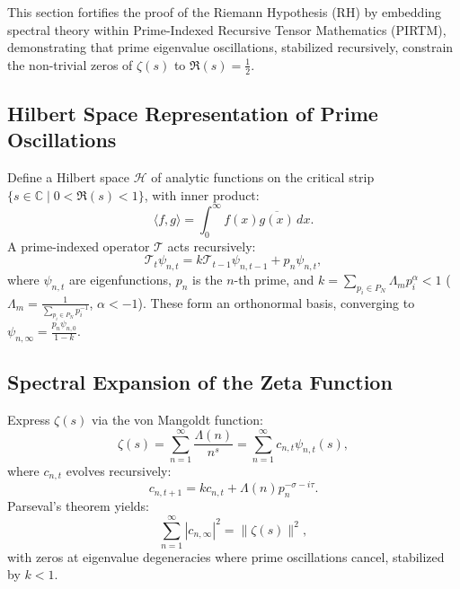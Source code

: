 \documentclass[11pt]{article}
\theoremstyle{plain}
\begin{document}
This section fortifies the proof of the Riemann Hypothesis (RH) by embedding spectral theory within Prime-Indexed Recursive Tensor Mathematics (PIRTM), demonstrating that prime eigenvalue oscillations, stabilized recursively, constrain the non-trivial zeros of \( \zeta(s) \) to \( \Re(s) = \frac{1}{2} \).

\subsection{Hilbert Space Representation of Prime Oscillations}
Define a Hilbert space \( \mathscr{H} \) of analytic functions on the critical strip \( \{ s \in \mathbb{C} \mid 0 < \Re(s) < 1 \} \), with inner product:
\begin{equation}
    \langle f, g \rangle = \int_{0}^{\infty} f(x) \overline{g(x)} \, dx.
\end{equation}
A prime-indexed operator \( \mathcal{T} \) acts recursively:
\begin{equation}
    \mathcal{T}_t \psi_{n,t} = k \mathcal{T}_{t-1} \psi_{n,t-1} + p_n \psi_{n,t},
\end{equation}
where \( \psi_{n,t} \) are eigenfunctions, \( p_n \) is the \( n \)-th prime, and \( k = \sum_{p_i \in P_N} \Lambda_m p_i^\alpha < 1 \) (\( \Lambda_m = \frac{1}{\sum_{p_i \in P_N} p_i^{-1}} \), \( \alpha < -1 \)). These form an orthonormal basis, converging to \( \psi_{n,\infty} = \frac{p_n \psi_{n,0}}{1 - k} \).

\subsection{Spectral Expansion of the Zeta Function}
Express \( \zeta(s) \) via the von Mangoldt function:
\begin{equation}
    \zeta(s) = \sum_{n=1}^{\infty} \frac{\Lambda(n)}{n^s} = \sum_{n=1}^{\infty} c_{n,t} \psi_{n,t}(s),
\end{equation}
where \( c_{n,t} \) evolves recursively:
\begin{equation}
    c_{n,t+1} = k c_{n,t} + \Lambda(n) p_n^{-\sigma - i \tau}.
\end{equation}
Parseval’s theorem yields:
\begin{equation}
    \sum_{n=1}^{\infty} |c_{n,\infty}|^2 = \|\zeta(s)\|^2,
\end{equation}
with zeros at eigenvalue degeneracies where prime oscillations cancel, stabilized by \( k < 1 \).
\end{document}
